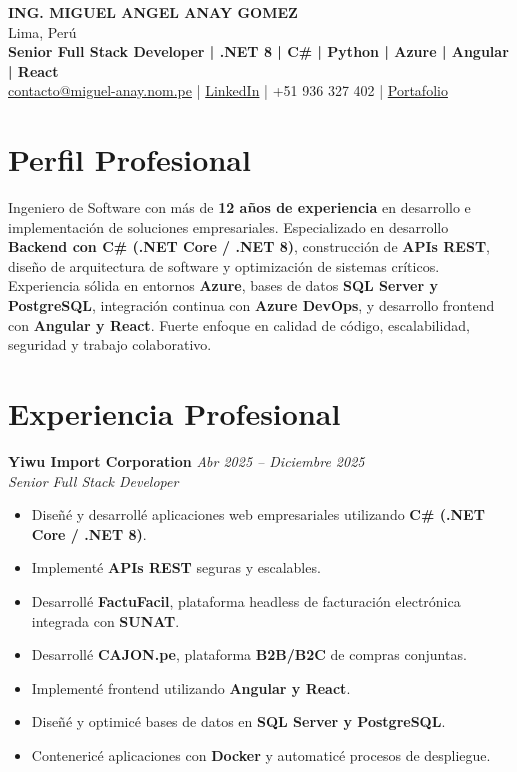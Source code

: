 \documentclass[11pt,a4paper]{article}
\begin{document}
\begin{center}
{\Large \textbf{ING. MIGUEL ANGEL ANAY GOMEZ}}\\
Lima, Perú\\
\textbf{Senior Full Stack Developer | .NET 8 | C\# | Python | Azure | Angular | React}\\
\href{mailto:contacto@miguel-anay.nom.pe}{contacto@miguel-anay.nom.pe} \;|\;
\href{https://www.linkedin.com/in/miguel-anay/}{LinkedIn} \;|\;
+51 936 327 402 \;|\;
\href{https://portfolio.miguel-anay.nom.pe}{Portafolio}
\end{center}

\vspace{0.3cm}

\section*{Perfil Profesional}

Ingeniero de Software con más de \textbf{12 años de experiencia} en desarrollo e implementación de soluciones empresariales.  
Especializado en desarrollo \textbf{Backend con C\# (.NET Core / .NET 8)}, construcción de \textbf{APIs REST}, diseño de arquitectura de software y optimización de sistemas críticos.  
Experiencia sólida en entornos \textbf{Azure}, bases de datos \textbf{SQL Server y PostgreSQL}, integración continua con \textbf{Azure DevOps}, y desarrollo frontend con \textbf{Angular y React}. Fuerte enfoque en calidad de código, escalabilidad, seguridad y trabajo colaborativo.

\section*{Experiencia Profesional}

\textbf{Yiwu Import Corporation} \hfill \textit{Abr 2025 – Diciembre 2025}\\
\textit{Senior Full Stack Developer}

\begin{itemize}[leftmargin=*]
  \item Diseñé y desarrollé aplicaciones web empresariales utilizando \textbf{C\# (.NET Core / .NET 8)}.
  \item Implementé \textbf{APIs REST} seguras y escalables.
  \item Desarrollé \textbf{FactuFacil}, plataforma headless de facturación electrónica integrada con \textbf{SUNAT}.
  \item Desarrollé \textbf{CAJON.pe}, plataforma \textbf{B2B/B2C} de compras conjuntas.
  \item Implementé frontend utilizando \textbf{Angular y React}.
  \item Diseñé y optimicé bases de datos en \textbf{SQL Server y PostgreSQL}.
  \item Contenericé aplicaciones con \textbf{Docker} y automaticé procesos de despliegue.
\end{itemize}
\end{document}

